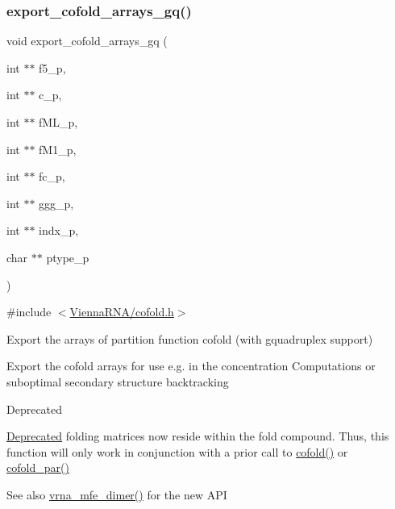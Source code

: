 \subsubsection{\texorpdfstring{export\+\_\+cofold\+\_\+arrays\+\_\+gq()}{export\_cofold\_arrays\_gq()}}
{\footnotesize\ttfamily void export\+\_\+cofold\+\_\+arrays\+\_\+gq (\begin{DoxyParamCaption}\item[{int $\ast$$\ast$}]{f5\+\_\+p,  }\item[{int $\ast$$\ast$}]{c\+\_\+p,  }\item[{int $\ast$$\ast$}]{f\+M\+L\+\_\+p,  }\item[{int $\ast$$\ast$}]{f\+M1\+\_\+p,  }\item[{int $\ast$$\ast$}]{fc\+\_\+p,  }\item[{int $\ast$$\ast$}]{ggg\+\_\+p,  }\item[{int $\ast$$\ast$}]{indx\+\_\+p,  }\item[{char $\ast$$\ast$}]{ptype\+\_\+p }\end{DoxyParamCaption})}



{\ttfamily \#include $<$\hyperlink{cofold_8h}{Vienna\+R\+N\+A/cofold.\+h}$>$}



Export the arrays of partition function cofold (with gquadruplex support) 

Export the cofold arrays for use e.\+g. in the concentration Computations or suboptimal secondary structure backtracking

\begin{DoxyRefDesc}{Deprecated}
\item[\hyperlink{deprecated__deprecated000035}{Deprecated}]folding matrices now reside within the fold compound. Thus, this function will only work in conjunction with a prior call to \hyperlink{group__mfe__cofold_gabc8517f22cfe70595ee81fc837910d52}{cofold()} or \hyperlink{group__mfe__cofold_ga7612cfeeb1b793f1e4179b1eb53df1f3}{cofold\+\_\+par()}\end{DoxyRefDesc}


\begin{DoxySeeAlso}{See also}
\hyperlink{group__mfe__cofold_gaab22d10c1190f205f16a77cab9d5d3ee}{vrna\+\_\+mfe\+\_\+dimer()} for the new A\+PI
\end{DoxySeeAlso}

